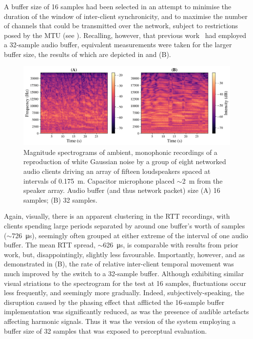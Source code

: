 A buffer size of 16 samples had been selected in an attempt to minimise the
duration of the window of inter-client synchronicity, and to maximise the
number of channels that could be transmitted over the network, subject to
restrictions posed by the MTU (see
).
Recalling, however, that previous
work~\citep{rushton_microcontroller-based_2023}
had employed a 32-sample audio buffer, equivalent measurements were taken for
the larger buffer size, the results of which are depicted in
 and (B).

\begin{figure}[ht]
    \centering
    \includegraphics[width=\textwidth]{figures/wgn_specgram_16_32}
    \caption{
        Magnitude spectrograms of ambient, monophonic recordings of a
        reproduction of white Gaussian noise by a group of eight networked
        audio clients driving an array of fifteen loudspeakers spaced at
        intervals of \qty{.175}{\m}.
        Capacitor microphone placed $\sim$\qty{2}{\m} from the
        speaker array.
        Audio buffer (and thus network packet) size (A) 16 samples;
        (B) 32 samples.
    }
    \label{fig:spectrograms}
\end{figure}

Again, visually, there is an apparent clustering in the RTT recordings, with
clients spending large periods separated by around one buffer's worth of
samples ($\sim$\qty{726}{\us}), seemingly often grouped at either
extreme of the interval of one audio buffer.
The mean RTT spread, $\sim$\qty{626}{\us}, is comparable with results
from prior work, but, disappointingly, slightly less favourable.
Importantly, however, and as demonstrated in (B), the
rate of relative inter-client temporal movement was much improved by the switch
to a 32-sample buffer.
Although exhibiting similar visual striations to the spectrogram for the test
at 16 samples, fluctuations occur less frequently, and seemingly more
gradually.
Indeed, subjectively-speaking, the disruption caused by the phasing effect
that afflicted the 16-sample buffer implementation was significantly reduced,
as was the presence of audible artefacts affecting harmonic signals.
Thus it was the version of the system employing a buffer size of 32 samples
that was exposed to perceptual evaluation.

